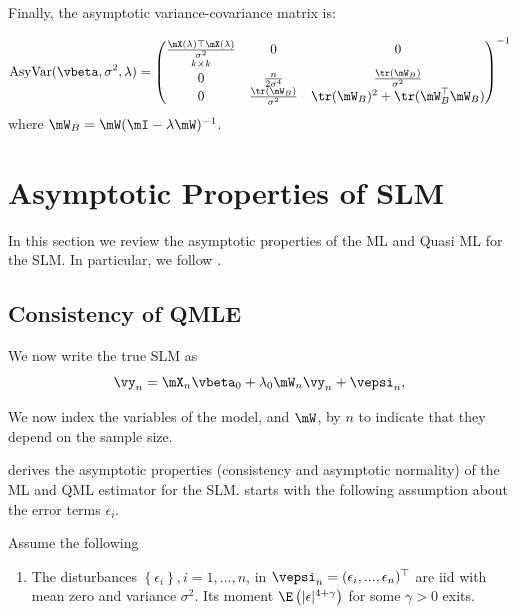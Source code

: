 Finally, the asymptotic variance-covariance matrix is:

\begin{equation}\label{eq:asyvar_sem}
\mbox{AsyVar}(\vbeta, \sigma^2, \lambda)  = 
\begin{pmatrix}
 \underset{k \times k}{\frac{\mX(\lambda)\top\mX(\lambda)}{\sigma^2}} & 0 & 0 \\
  0 & \frac{n}{2\sigma^4} & \frac{\tr(\mW_B)}{\sigma^2} \\
 0 & \frac{\tr(\mW_B)}{\sigma^2} & \tr(\mW_B)^2 + \tr(\mW_B^\top\mW_B)
\end{pmatrix}^{-1}
\end{equation}
%
where $\mW_B = \mW(\mI - \lambda\mW)^{-1}$.

\section{Asymptotic Properties of SLM}

In this section we review the asymptotic properties of the ML and Quasi ML for the SLM. In particular, we follow \cite{lee2004asymptotic}.

\subsection{Consistency of QMLE}

We now write the true SLM as
\begin{equation*}
\vy_n = \mX_n\vbeta_0 + \lambda_0\mW_n\vy_n + \vepsi_n,
\end{equation*}

We now index the variables of the model, and $\mW$, by $n$ to indicate that they depend on the sample size. 

\cite{lee2004asymptotic} derives the asymptotic properties (consistency and asymptotic normality) of the ML and QML estimator for the SLM. \cite{lee2004asymptotic} starts with the following assumption about the error terms $\epsilon_{i}$. 

\begin{assumption}\label{assu:ml_1}
Assume the following
  \begin{enumerate}
    \item The disturbances $\left\lbrace \epsilon_{i}\right\rbrace, i = 1, ..., n$, in $\vepsi_n = (\epsilon_i, ..., \epsilon_n)^\top$ are iid with mean zero and variance $\sigma^2$. Its moment $\E\left(|\epsilon|^{4 + \gamma}\right)$ for some $\gamma > 0$ exits.
  \end{enumerate}  
\end{assumption}

